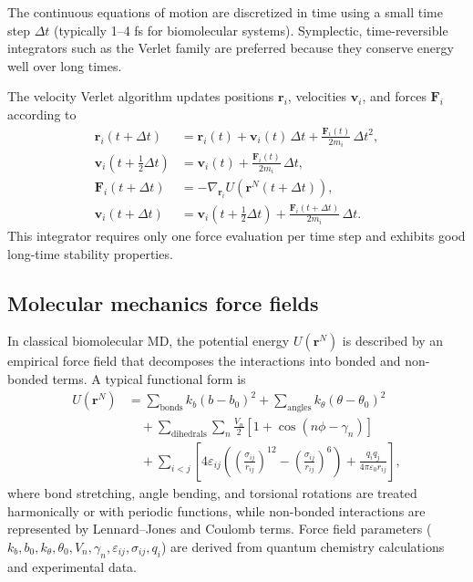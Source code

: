 \documentclass[12pt]{article}
\begin{document}
The continuous equations of motion are discretized in time using a small time step $\Delta t$ (typically 1--4 fs for biomolecular systems). Symplectic, time-reversible integrators such as the Verlet family are preferred because they conserve energy well over long times.\cite{CH9_FrenkelSmit2023}

The velocity Verlet algorithm updates positions $\mathbf{r}_i$, velocities $\mathbf{v}_i$, and forces $\mathbf{F}_i$ according to
\begin{align}
\mathbf{r}_i(t+\Delta t) &= \mathbf{r}_i(t) + \mathbf{v}_i(t)\,\Delta t + \frac{\mathbf{F}_i(t)}{2m_i}\,\Delta t^2, \\
\mathbf{v}_i(t+\tfrac{1}{2}\Delta t) &= \mathbf{v}_i(t) + \frac{\mathbf{F}_i(t)}{2m_i}\,\Delta t, \\
\mathbf{F}_i(t+\Delta t) &= -\nabla_{\mathbf{r}_i} U(\mathbf{r}^N(t+\Delta t)), \\
\mathbf{v}_i(t+\Delta t) &= \mathbf{v}_i(t+\tfrac{1}{2}\Delta t) + \frac{\mathbf{F}_i(t+\Delta t)}{2m_i}\,\Delta t.
\end{align}
This integrator requires only one force evaluation per time step and exhibits good long-time stability properties.

\subsection{Molecular mechanics force fields}

In classical biomolecular MD, the potential energy $U(\mathbf{r}^N)$ is described by an empirical force field that decomposes the interactions into bonded and non-bonded terms.\cite{CH9_Cornell1995,CH9_MacKerell1998} 
A typical functional form is
\begin{align}
U(\mathbf{r}^N) &= \sum_{\text{bonds}} k_b (b - b_0)^2
+ \sum_{\text{angles}} k_\theta (\theta - \theta_0)^2 \nonumber \\
&\quad + \sum_{\text{dihedrals}} \sum_n \frac{V_n}{2} \left[1 + \cos(n\phi - \gamma_n)\right] \nonumber\\
&\quad + \sum_{i<j} \left[4\varepsilon_{ij} \left( \left(\frac{\sigma_{ij}}{r_{ij}}\right)^{12} - \left(\frac{\sigma_{ij}}{r_{ij}}\right)^6 \right)
+ \frac{q_i q_j}{4\pi\varepsilon_0 r_{ij}} \right],
\end{align}
where bond stretching, angle bending, and torsional rotations are treated harmonically or with periodic functions, while non-bonded interactions are represented by Lennard--Jones and Coulomb terms. Force field parameters ($k_b, b_0, k_\theta, \theta_0, V_n, \gamma_n, \varepsilon_{ij}, \sigma_{ij}, q_i$) are derived from quantum chemistry calculations and experimental data.
\end{document}
